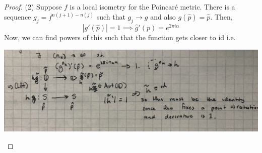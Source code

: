 \documentclass[a4paper, 11pt]{book}
\theoremstyle{definition}
\theoremstyle{remark}
\begin{document}
\begin{proof}
        (2) Suppose $f$ is a local isometry for the Poincaré metric. There is a sequence $g_j = f^{n(j+1)-n(j)}$ such that
        $g_j\to g$ and also $g(\hat{p}) = \hat{p}$. Then,
        \[ |g'(\hat{p})| = 1 \implies \hat{g}'(p) = e^{2\pi i\alpha} \]
        Now, we can find powers of this such that the function gets closer to id i.e.
        \begin{center}
            \includegraphics[scale=0.08]{IMG_1127}
        \end{center}
    \end{proof}
\end{document}
